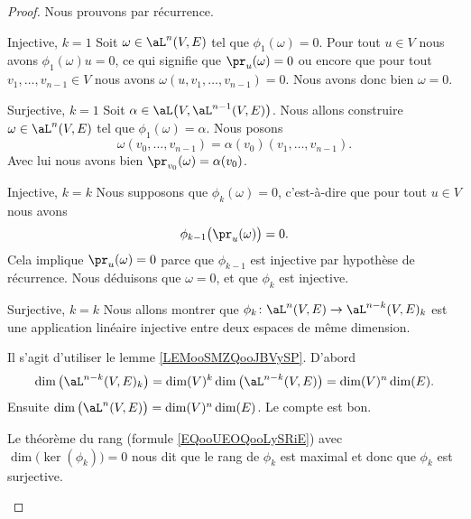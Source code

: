 \begin{proof}
    Nous prouvons par récurrence. 
    \begin{subproof}
        \item[Injective, \( k=1\)]
            Soit \( \omega\in \aL^n(V,E)\) tel que \( \phi_1(\omega)=0\). Pour tout \( u\in V\) nous avons \( \phi_1(\omega)u=0\), ce qui signifie que \( \pr_u(\omega)=0\) ou encore que pour tout \( v_1,\ldots, v_{n-1}\in V\) nous avons \( \omega(u,v_1,\ldots, v_{n-1})=0\). Nous avons donc bien \( \omega=0\).
        \item[Surjective, \( k=1\)]
            Soit \( \alpha\in\aL\big( V,\aL^{n-1}(V,E) \big)\). Nous allons construire \( \omega\in \aL^n(V,E)\) tel que \( \phi_1(\omega)=\alpha\). Nous posons
            \begin{equation}
                \omega(v_0,\ldots, v_{n-1})=\alpha(v_0)(v_1,\ldots, v_{n-1}).
            \end{equation}
            Avec lui nous avons bien \( \pr_{v_0}(\omega)=\alpha(v_0)\).
        \item[Injective, \( k=k\)]
            Nous supposons que \( \phi_k(\omega)=0\), c'est-à-dire que pour tout \( u\in V\) nous avons 
            \begin{equation}
                \phi_{k-1}\big( \pr_u(\omega) \big)=0.
            \end{equation}
            Cela implique \( \pr_u(\omega)=0\) parce que \( \phi_{k-1}\) est injective par hypothèse de récurrence. Nous déduisons que \( \omega=0\), et que \( \phi_k\) est injective.

        \item[Surjective, \( k=k\)]
            Nous allons montrer que \(   \phi_k\colon \aL^n(V,E)\to \aL^{n-k}(V,E)_k  \) est une application linéaire injective entre deux espaces de même dimension.

            Il s'agit d'utiliser le lemme \ref{LEMooSMZQooJBVySP}. D'abord
            \begin{equation}
                \dim\big( \aL^{n-k}(V,E)_k \big)=\dim(V)^k\dim\big( \aL^{n-k}(V,E) \big)=\dim(V)^n\dim(E).
            \end{equation}
            Ensuite \( \dim\big( \aL^n(V,E) \big)=\dim(V)^n\dim(E)\). Le compte est bon.

            Le théorème du rang (formule \eqref{EQooUEOQooLySRiE}) avec \( \dim\big( \ker(\phi_k) \big)=0\) nous dit que le rang de \( \phi_k\) est maximal et donc que \( \phi_k\) est surjective.
    \end{subproof}
\end{proof}

